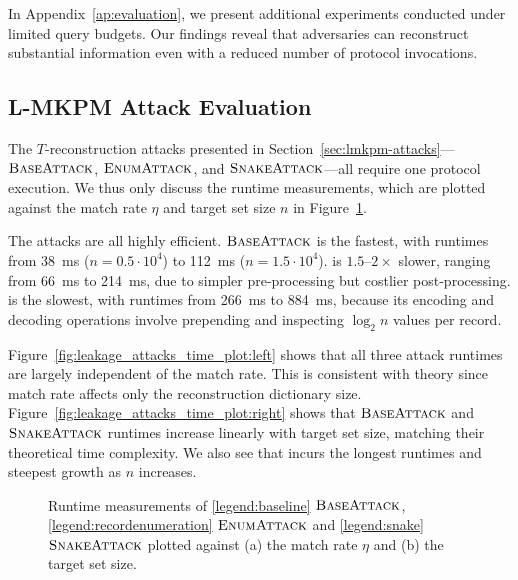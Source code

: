 In Appendix~\ref{ap:evaluation}, we present additional experiments conducted under limited query budgets. Our findings reveal that adversaries can reconstruct substantial information even with a reduced number of protocol invocations.

\subsection{L-MKPM Attack Evaluation}
The $T$-reconstruction attacks presented in
Section~\ref{sec:lmkpm-attacks}---$\textsc{BaseAttack}{}$, $\textsc{EnumAttack}{}$, and
$\textsc{SnakeAttack}{}$---all require one protocol execution.  We thus only
discuss the runtime measurements, which are plotted against the match rate
$\eta$ and target set size $n$ in Figure~\ref{fig:leakage_attacks_time_plot}.

The attacks are all highly efficient. $\textsc{BaseAttack}{}$ is the fastest, with
runtimes from \SI{38}{\milli\second} ($n = 0.5 \cdot 10^4$) to
\SI{112}{\milli\second} ($n = 1.5 \cdot 10^4$). \snakeattack{} is
$1.5$--$2\times$ slower, ranging from \SI{66}{\milli\second} to
\SI{214}{\milli\second}, due to simpler pre-processing but costlier
post-processing. \recenumattack{} is the slowest, with runtimes from
\SI{266}{\milli\second} to \SI{884}{\milli\second}, because its encoding and
decoding operations involve prepending and inspecting $\log_2 n$ values per
record.

Figure~\ref{fig:leakage_attacks_time_plot:left} shows that all three attack
runtimes are largely independent of the match rate. This is consistent with
theory since match rate affects only the reconstruction dictionary
size. Figure~\ref{fig:leakage_attacks_time_plot:right} shows that
$\textsc{BaseAttack}{}$ and $\textsc{SnakeAttack}{}$ runtimes increase linearly with target
set size, matching their theoretical time complexity. We also see that
\recenumattack{} incurs the longest runtimes and steepest growth as $n$
increases.



\begin{figure}[t]
	\centering
	\caption{Runtime measurements of \ref{legend:baseline} $\textsc{BaseAttack}$, \ref{legend:recordenumeration} $\textsc{EnumAttack}$ and \ref{legend:snake} $\textsc{SnakeAttack}$
	plotted against (a) the match rate $\eta$ and (b) the target set size.
	}\label{fig:leakage_attacks_time_plot}
\end{figure}


